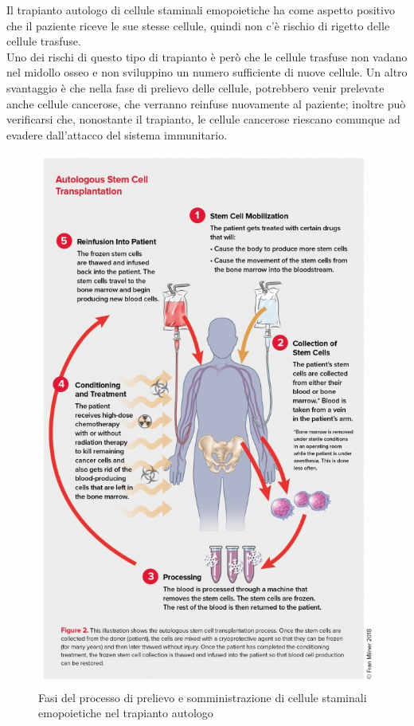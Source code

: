 Il trapianto autologo di cellule staminali emopoietiche ha come aspetto positivo che il paziente riceve le sue 
stesse cellule, quindi non c’è rischio di rigetto delle cellule trasfuse.\\ 
Uno dei rischi di questo tipo di trapianto è però che le cellule trasfuse non vadano nel midollo osseo e non 
sviluppino un numero sufficiente di nuove cellule. Un altro svantaggio è che nella fase di prelievo delle cellule, 
potrebbero venir prelevate anche cellule cancerose, che verranno reinfuse nuovamente al paziente; inoltre può 
verificarsi che, nonostante il trapianto, le cellule cancerose riescano comunque ad evadere dall’attacco 
del sistema immunitario\cite{STEMCELLS}.

\begin{figure}[H]
    \begin{center}
    \includegraphics[width=0.7\columnwidth]{img/AUTOLOGO.jpeg}
    \vspace{-3mm}
    \end{center}
    \caption{Fasi del processo di prelievo e somministrazione di cellule staminali emopoietiche nel trapianto autologo
    \cite{LLSBLOOD}}
    \label{fig:FIGURE_3.15}
\end{figure}

